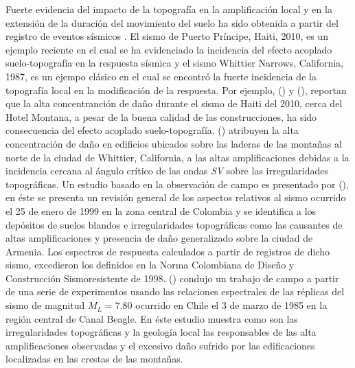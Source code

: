\documentclass[spanish,letterpaper,12pt,twoside,openany]{article}
\begin{document}
Fuerte evidencia del impacto de la topografía en la amplificación local y en la extensión de la duración del movimiento del suelo ha sido obtenida a partir del registro de eventos sísmicos \citep{Hough2011, assimaki2005effects, spudich1996directional, kawase1990topography, celebi1987topographical, trifunac1971analysis}. El sismo de Puerto Príncipe, Haiti, 2010, es un ejemplo reciente en el cual se ha evidenciado la incidencia del efecto acoplado suelo-topografía en la respuesta sísmica y el sismo Whittier Narrows, California, 1987, es un ejempo clásico en el cual se encontró la fuerte incidencia de la topografía local en la modificación de la respuesta. Por ejemplo, \citeauthor{Assimaki2013} (\citeyear{Assimaki2013}) y \citeauthor{Hough2011} (\citeyear{Hough2011}), reportan que la alta concentranción de daño durante el sismo de Haiti del 2010, cerca del Hotel Montana, a pesar de la buena calidad de las construcciones, ha sido consecuencia del efecto acoplado suelo-topografía. \citeauthor{kawase1990topography} (\citeyear{kawase1990topography}) atribuyen la alta concentración de daño en edificios ubicados sobre las laderas de las montañas al norte de la ciudad de Whittier, California, a las altas amplificaciones debidas a la incidencia cercana al ángulo crítico de las ondas \textit{SV} sobre las irregularidades topográficas. Un estudio basado en la observación de campo es presentado por \citeauthor{SanchezSilva2000} (\citeyear{SanchezSilva2000}), en éste se presenta un revisión general de los aspectos relativos al sismo ocurrido el 25 de enero de 1999 en la zona central de Colombia y se identifica a los depósitos de suelos blandos e irregularidades topográficas como las causantes de altas amplificaciones y presencia de daño generalizado sobre la ciudad de Armenia. Los espectros de respuesta calculados a partir de registros de dicho sismo, excedieron los definidos en la Norma Colombiana de Diseño y Construcción Sismoresistente de 1998. \citeauthor{celebi1987topographical} (\citeyear{celebi1987topographical}) condujo un trabajo de campo a partir de una serie de experimentos usando las relaciones espectrales de las réplicas del sismo de magnitud $M_L=7.80$ ocurrido en Chile el 3 de marzo de 1985 en la región central de Canal Beagle. En éste estudio muestra como son las irregularidades topográficas y la geología local las responsables de las alta amplificaciones observadas y el excesivo daño sufrido por las edificaciones localizadas en las crestas de las montañas.
\end{document}
